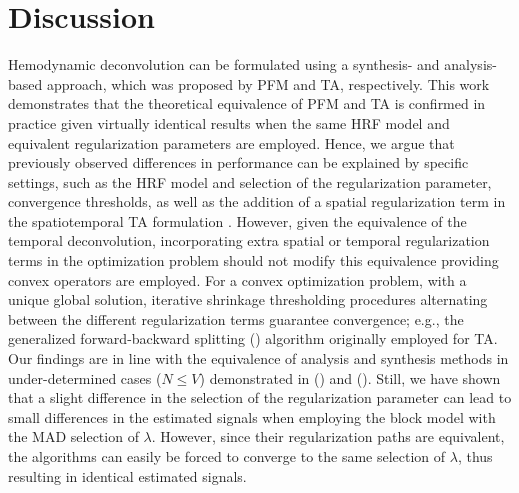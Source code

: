 
\section{Discussion}

Hemodynamic deconvolution can be formulated using a synthesis- and analysis-based approach, which was proposed by PFM and TA, respectively. This work demonstrates that the theoretical equivalence of PFM and TA is confirmed in practice given virtually identical results when the same HRF model and equivalent regularization parameters are employed. Hence, we argue that previously observed differences in performance can be explained by specific settings, such as the HRF model and selection of the regularization parameter, convergence thresholds, as well as the addition of a spatial regularization term in the spatiotemporal TA formulation \citealt{Karahanoglu2013TotalactivationfMRI}. However, given the equivalence of the temporal deconvolution, incorporating extra spatial or temporal regularization terms in the optimization problem should not modify this equivalence providing convex operators are employed. For a convex optimization problem, with a unique global solution, iterative shrinkage thresholding procedures alternating between the different regularization terms guarantee convergence; e.g., the generalized forward-backward splitting (\citealt{Raguet2013GeneralizedForwardBackward}) algorithm originally employed for TA. Our findings are in line with the equivalence of analysis and synthesis methods in under-determined cases (\(N \leq V\)) demonstrated in (\citealt{Elad2007Analysisversussynthesis}) and (\citealt{ortelli2019synthesis}). Still, we have shown that a slight difference in the selection of the regularization parameter can lead to small differences in the estimated signals when employing the block model with the MAD selection of $\lambda$. However, since their regularization paths are equivalent, the algorithms can easily be forced to converge to the same selection of $\lambda$, thus resulting in identical estimated signals.

